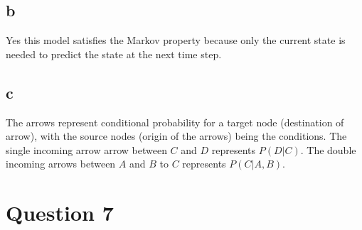 \documentclass[12pt]{article}
\begin{document}
\subsection{b}
Yes this model satisfies the Markov property because only the current state is needed to predict the state at the next time step.
\subsection{c}
The arrows represent conditional probability for a target node (destination of arrow), with the source nodes (origin of the arrows) being the conditions.
The single incoming arrow arrow between $C$ and $D$ represents $P(D|C)$. The double incoming arrows between $A$ and $B$ to $C$ represents $P(C|A,B)$.

\section{Question 7}
\end{document}
